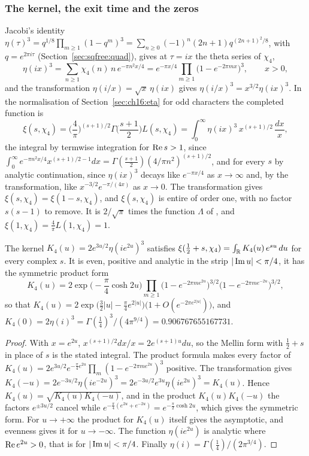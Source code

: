 \subsubsection{The kernel, the exit time and the zeros}\label{sec:dbeta:kernel}

Jacobi's identity $\eta(\tau)^3=q^{1/8}\prod_{m\ge1}(1-q^m)^3=\sum_{n\ge0}(-1)^n(2n+1)q^{(2n+1)^2/8}$, with $q=e^{2\pi i\tau}$ (Section~\ref{sec:sqfree:quad}), gives at $\tau=ix$ the theta series of $\chi_4$,
\[
\eta(ix)^3=\sum_{n\ge1}\chi_4(n)\,n\,e^{-\pi n^2x/4}=e^{-\pi x/4}\prod_{m\ge1}\big(1-e^{-2\pi mx}\big)^3,\qquad x>0,
\]
and the transformation $\eta(i/x)=\sqrt x\,\eta(ix)$ gives $\eta(i/x)^3=x^{3/2}\eta(ix)^3$. In the normalisation of Section~\ref{sec:ch16:eta} for odd characters the completed function is
\[
\xi(s,\chi_4)=\Big(\frac4\pi\Big)^{(s+1)/2}\Gamma\Big(\frac{s+1}2\Big)L(s,\chi_4)=\int_0^\infty\eta(ix)^3\,x^{(s+1)/2}\,\frac{dx}x,
\]
the integral by termwise integration for $\operatorname{Re} s>1$, since $\int_0^\infty e^{-\pi n^2x/4}x^{(s+1)/2-1}dx=\Gamma(\frac{s+1}2)(4/\pi n^2)^{(s+1)/2}$, and for every $s$ by analytic continuation, since $\eta(ix)^3$ decays like $e^{-\pi x/4}$ as $x\to\infty$ and, by the transformation, like $x^{-3/2}e^{-\pi/(4x)}$ as $x\to0$. The transformation gives $\xi(s,\chi_4)=\xi(1-s,\chi_4)$, and $\xi(s,\chi_4)$ is entire of order one, with no factor $s(s-1)$ to remove. It is $2/\sqrt\pi$ times the function $\Lambda$ of \cite{P26beta}, and $\xi(1,\chi_4)=\frac4\pi L(1,\chi_4)=1$.

\begin{proposition}\label{prop:dbeta:kernel}
The kernel $K_4(u)=2e^{3u/2}\eta(ie^{2u})^3$ satisfies $\xi(\frac12+s,\chi_4)=\int_{\mathbb{R}}K_4(u)\,e^{su}\,du$ for every complex $s$. It is even, positive and analytic in the strip $|\operatorname{Im} u|<\pi/4$, it has the symmetric product form
\[
K_4(u)=2\exp\Big(-\frac\pi4\cosh2u\Big)\prod_{m\ge1}\big(1-e^{-2\pi me^{2u}}\big)^{3/2}\big(1-e^{-2\pi me^{-2u}}\big)^{3/2},
\]
so that $K_4(u)=2\exp\big(\frac32|u|-\frac\pi4e^{2|u|}\big)\big(1+O(e^{-2\pi e^{2|u|}})\big)$, and $K_4(0)=2\eta(i)^3=\Gamma(\frac14)^3/(4\pi^{9/4})=0.906767655167731$.
\end{proposition}

\begin{proof}
With $x=e^{2u}$, $x^{(s+1)/2}dx/x=2e^{(s+1)u}du$, so the Mellin form with $\frac12+s$ in place of $s$ is the stated integral. The product formula makes every factor of $K_4(u)=2e^{3u/2}e^{-\frac\pi4e^{2u}}\prod_m(1-e^{-2\pi me^{2u}})^3$ positive. The transformation gives $K_4(-u)=2e^{-3u/2}\eta(ie^{-2u})^3=2e^{-3u/2}e^{3u}\eta(ie^{2u})^3=K_4(u)$. Hence $K_4(u)=\sqrt{K_4(u)K_4(-u)}$, and in the product $K_4(u)K_4(-u)$ the factors $e^{\pm3u/2}$ cancel while $e^{-\frac\pi4(e^{2u}+e^{-2u})}=e^{-\frac\pi2\cosh2u}$, which gives the symmetric form. For $u\to+\infty$ the product for $K_4(u)$ itself gives the asymptotic, and evenness gives it for $u\to-\infty$. The function $\eta(ie^{2u})$ is analytic where $\operatorname{Re} e^{2u}>0$, that is for $|\operatorname{Im} u|<\pi/4$. Finally $\eta(i)=\Gamma(\frac14)/(2\pi^{3/4})$.
\end{proof}


